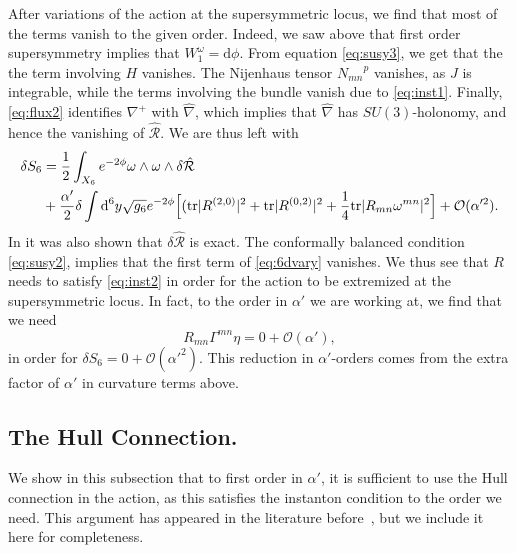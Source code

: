 \documentclass[12pt,a4paper]{article}
\def\a{\alpha'}
\def\d{\textrm{d}}
\def\tr{\textrm{tr}}
\def\OO{\mathcal{O}}
\theoremstyle{definition}
\begin{document}
After variations of the action at the supersymmetric locus, we find that most of the terms vanish to the given order. Indeed,  we saw above that first order supersymmetry implies that $W_1^\omega=\d\phi$.  From equation \eqref{eq:susy3}, we get that the the term involving $H$ vanishes. The Nijenhaus tensor ${N_{mn}}^p$ vanishes, as $J$ is integrable, while the terms involving the bundle vanish due to \eqref{eq:inst1}. Finally, \eqref{eq:flux2} identifies $\nabla^+$ with $\hat\nabla$, which implies that $\hat\nabla$ has $SU(3)$-holonomy, and hence  the vanishing of $\mathcal{\hat R}$. We are thus left with
\begin{align}
\label{eq:6dvary}
\delta S_6&=\frac{1}{2}\int_{X_6}e^{-2\phi}\omega\wedge\omega\wedge\delta\mathcal{\hat R}\notag\\
&+\frac{\alpha'}{2}\delta\int\d ^6y\sqrt{g_6}e^{-2\phi}\Big[(\tr\vert{R}^{(2,0)}\vert^2+\tr\vert {R}^{(0,2)}\vert^2+\frac{1}{4}\tr\vert R_{mn}\omega^{mn}\vert^2\Big]+\OO(\a^2).
\end{align}
In \cite{LopesCardoso:2003af} it was also shown that $\delta\mathcal{\hat R}$ is exact. The conformally balanced condition \eqref{eq:susy2}, implies that the first term of \eqref{eq:6dvary} vanishes. We thus see that $R$ needs to satisfy \eqref{eq:inst2} in order for the action to be extremized at the supersymmetric locus. In fact, to the order in $\alpha'$ we are working at, we find that we need
\begin{equation}
R_{mn}\Gamma^{mn}\eta= 0 + \OO(\a),
\end{equation}
in order  for $\delta S_6=0 + \OO(\a^2)$. This reduction in $\a$-orders comes from the extra factor of $\a$ in curvature terms above.

\subsection{The Hull Connection.}
We show in this subsection that to first order in $\alpha'$, it is sufficient to use the Hull connection in the action, as this satisfies the instanton condition to the order we need. This argument has appeared in the literature before~\citep{Martelli:2010jx}, but we include it here for completeness.
\end{document}
